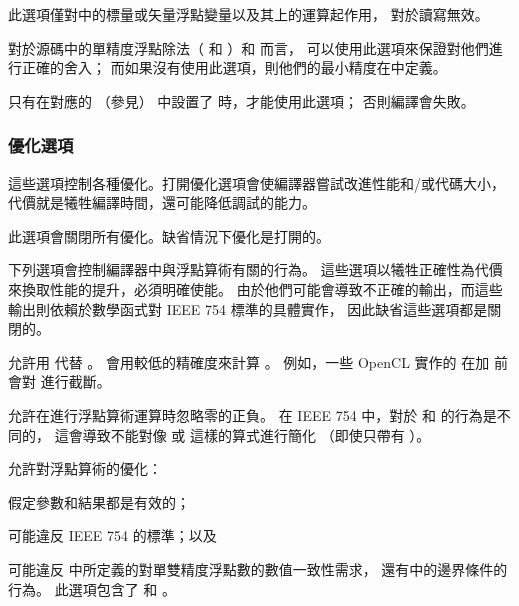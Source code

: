 此選項僅對中的標量或矢量浮點變量以及其上的運算起作用，
對於讀寫無效。
\stopclOption

對於源碼中的單精度浮點除法（  和  ）和  而言，
可以使用此選項來保證對他們進行正確的舍入；
而如果沒有使用此選項，則他們的最小精度在中定義。

只有在對應的  （參見）
中設置了  時，才能使用此選項；
否則編譯會失敗。
\stopclOption

\subsubsection[sec:OptimizationOption]{優化選項}

這些選項控制各種優化。打開優化選項會使編譯器嘗試改進性能和/或代碼大小，
代價就是犧牲編譯時間，還可能降低調試的能力。

此選項會關閉所有優化。缺省情況下優化是打開的。
\stopclOption

下列選項會控制編譯器中與浮點算術有關的行為。
這些選項以犧牲正確性為代價來換取性能的提升，必須明確使能。
由於他們可能會導致不正確的輸出，而這些輸出則依賴於數學函式對 IEEE 754 標準的具體實作，
因此缺省這些選項都是關閉的。

允許用  代替 。
  會用較低的精確度來計算 。
例如，一些 OpenCL 實作的  在加  前會對  進行截斷。
\stopclOption

允許在進行浮點算術運算時忽略零的正負。
在 IEEE 754 中，對於  和  的行為是不同的，
這會導致不能對像  或  這樣的算式進行簡化
（即使只帶有  ）。
\stopclOption

允許對浮點算術的優化：
\startigBase
\item 假定參數和結果都是有效的；
\item 可能違反 IEEE 754 的標準；以及
\item 可能違反 中所定義的對單雙精度浮點數的數值一致性需求，
還有中的邊界條件的行為。
\stopigBase
此選項包含了  和 。
\stopclOption


